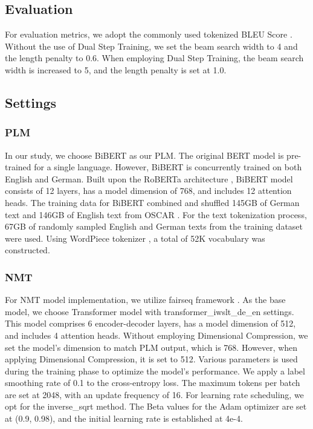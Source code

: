 \documentclass[conference]{IEEEtran}
\begin{document}
\subsection{Evaluation}
For evaluation metrics, we adopt the commonly used tokenized BLEU Score \cite{papineni2002bleu}. Without the use of Dual Step Training, we set the beam search width to 4 and the length penalty to 0.6. When employing Dual Step Training, the beam search width is increased to 5, and the length penalty is set at 1.0.
\subsection{Settings}
\subsubsection{PLM}
In our study, we choose BiBERT \cite{xu2021bibert} as our PLM. The original BERT model \cite{devlin2019bert} is pre-trained for a single language. However, BiBERT is concurrently trained on both English and German. Built upon the RoBERTa architecture \cite{Liu2019}, BiBERT model consists of 12 layers, has a model dimension of 768, and includes 12 attention heads. The training data for BiBERT combined and shuffled 145GB of German text and 146GB of English text from OSCAR \cite{suarez2019monolingual}. For the text tokenization process, 67GB of randomly sampled English and German texts from the training dataset were used. Using WordPiece tokenizer \cite{wu2016google}, a total of 52K vocabulary was constructed.

\subsubsection{NMT}
For NMT model implementation, we utilize fairseq framework \cite{ott2019fairseq}. As the base model, we choose Transformer model \cite{vaswani2017attention} with transformer\_iwslt\_de\_en settings. This model comprises 6 encoder-decoder layers, has a model dimension of 512, and includes 4 attention heads. Without employing Dimensional Compression, we set the model's dimension to match PLM output, which is 768. However, when applying Dimensional Compression, it is set to 512. Various parameters is used during the training phase to optimize the model's performance. We apply a label smoothing rate of 0.1 to the cross-entropy loss. The maximum tokens per batch are set at 2048, with an update frequency of 16. For learning rate scheduling, we opt for the inverse\_sqrt method. The Beta values for the Adam optimizer are set at (0.9, 0.98), and the initial learning rate is established at 4e-4.
\end{document}

